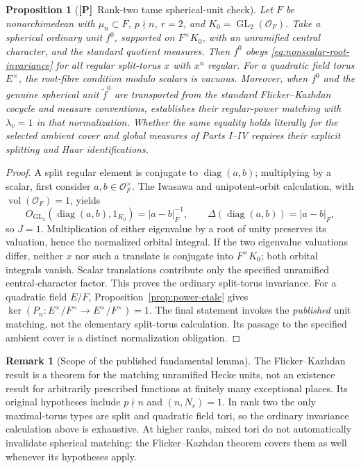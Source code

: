 \documentclass[11pt]{article}
\newcommand{\GL}{\operatorname{GL}}
\newcommand{\Ptag}{\textnormal{\textbf{[P]}}}
\theoremstyle{plain}
\newtheorem{proposition}[theorem]{Proposition}
\theoremstyle{definition}
\newtheorem{remark}[theorem]{Remark}
\begin{document}
\begin{proposition}[\Ptag\ Rank-two tame spherical-unit check]
\label{prop:ranktwo-unit}
Let $F$ be nonarchimedean with $\mu_n\subset F$, $p\nmid n$,
$r=2$, and $K_0=\GL_2(\mathcal O_F)$.  Take a spherical ordinary
unit $f^0$, supported on $F^\times K_0$, with an unramified
central character, and the standard quotient measures. Then
$f^0$ obeys \eqref{eq:nonscalar-root-invariance} for all regular
split-torus $x$ with $x^n$ regular.  For a quadratic field torus
$E^\times$, the root-fibre condition modulo scalars is vacuous.
Moreover, when $f^0$ and the genuine spherical unit
$\widetilde f^0$ are transported from the standard
Flicker--Kazhdan cocycle and measure conventions,
\cite[\S12, Corollary]{FK} establishes their regular-power
matching with $\lambda_v=1$ in that normalization.  Whether the
same equality holds \emph{literally} for the selected ambient
cover and global measures of Parts I--IV requires their explicit
splitting and Haar identifications.
\end{proposition}
\begin{proof}
A split regular element is conjugate to
$\operatorname{diag}(a,b)$; multiplying by a scalar, first
consider $a,b\in\mathcal O_F^\times$.  The Iwasawa and
unipotent-orbit calculation, with $\operatorname{vol}(\mathcal
O_F)=1$, yields
\[
 O_{\GL_2}\!\left(\operatorname{diag}(a,b),1_{K_0}\right)
       =|a-b|_F^{-1},\qquad
 \Delta\!\left(\operatorname{diag}(a,b)\right)=|a-b|_F,
\]
so $J=1$.  Multiplication of either eigenvalue by a root of unity
preserves its valuation, hence the normalized orbital integral.
If the two eigenvalue valuations differ, neither $x$ nor such a
translate is conjugate into $F^\times K_0$; both orbital
integrals vanish. Scalar translations contribute only the
specified unramified central-character factor.  This proves the
ordinary split-torus invariance. For a quadratic field $E/F$,
Proposition~\ref{prop:power-etale} gives
$\ker(P_n:E^\times/F^\times\to E^\times/F^\times)=1$.
The final statement invokes the \emph{published} unit matching,
not the elementary split-torus calculation.  Its passage to the
specified ambient cover is a distinct normalization obligation.
\end{proof}

\begin{remark}[Scope of the published fundamental lemma]
\label{rem:fk-range}
The Flicker--Kazhdan result is a theorem for the matching
unramified Hecke units, not an existence result for arbitrarily
prescribed functions at finitely many exceptional places.
Its original hypotheses include $p\nmid n$ and
$(n,N_r)=1$. In rank two the only maximal-torus types are
split and quadratic field tori, so the ordinary invariance
calculation above is exhaustive.  At higher ranks, mixed tori
do not automatically invalidate spherical matching: the
Flicker--Kazhdan theorem covers them as well whenever its
hypotheses apply.
\end{remark}
\end{document}
